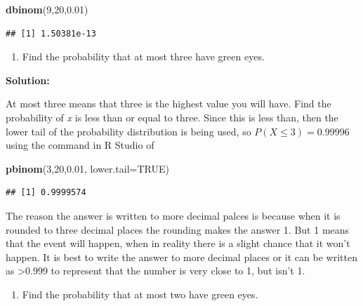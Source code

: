 \documentclass[
]{book}
\newenvironment{Shaded}{\begin{snugshade}}{\end{snugshade}}
\newcommand{\DataTypeTok}[1]{\textcolor[rgb]{0.13,0.29,0.53}{#1}}
\newcommand{\DecValTok}[1]{\textcolor[rgb]{0.00,0.00,0.81}{#1}}
\newcommand{\FloatTok}[1]{\textcolor[rgb]{0.00,0.00,0.81}{#1}}
\newcommand{\KeywordTok}[1]{\textcolor[rgb]{0.13,0.29,0.53}{\textbf{#1}}}
\newcommand{\NormalTok}[1]{#1}
\newcommand{\OtherTok}[1]{\textcolor[rgb]{0.56,0.35,0.01}{#1}}
\providecommand{\tightlist}{%
  \setlength{\itemsep}{0pt}\setlength{\parskip}{0pt}}
\begin{document}
\begin{Shaded}
\begin{Highlighting}[]
\KeywordTok{dbinom}\NormalTok{(}\DecValTok{9}\NormalTok{,}\DecValTok{20}\NormalTok{,}\FloatTok{0.01}\NormalTok{)}
\end{Highlighting}
\end{Shaded}

\begin{verbatim}
## [1] 1.50381e-13
\end{verbatim}

\begin{enumerate}
\def\labelenumi{\alph{enumi}.}
\setcounter{enumi}{4}
\tightlist
\item
  Find the probability that at most three have green eyes.
\end{enumerate}

\textbf{Solution:}

At most three means that three is the highest value you will have. Find the probability of \emph{x} is less than or equal to three. Since this is less than, then the lower tail of the probability distribution is being used, so \(P(X \le 3)=0.99996\) using the command in R Studio of

\begin{Shaded}
\begin{Highlighting}[]
\KeywordTok{pbinom}\NormalTok{(}\DecValTok{3}\NormalTok{,}\DecValTok{20}\NormalTok{,}\FloatTok{0.01}\NormalTok{, }\DataTypeTok{lower.tail=}\OtherTok{TRUE}\NormalTok{)}
\end{Highlighting}
\end{Shaded}

\begin{verbatim}
## [1] 0.9999574
\end{verbatim}

The reason the answer is written to more decimal palces is because when it is rounded to three decimal places the rounding makes the answer 1. But 1 means that the event will happen, when in reality there is a slight chance that it won't happen. It is best to write the answer to more decimal places or it can be written as \textgreater0.999 to represent that the number is very close to 1, but isn't 1.

\begin{enumerate}
\def\labelenumi{\alph{enumi}.}
\setcounter{enumi}{5}
\tightlist
\item
  Find the probability that at most two have green eyes.
\end{enumerate}
\end{document}

